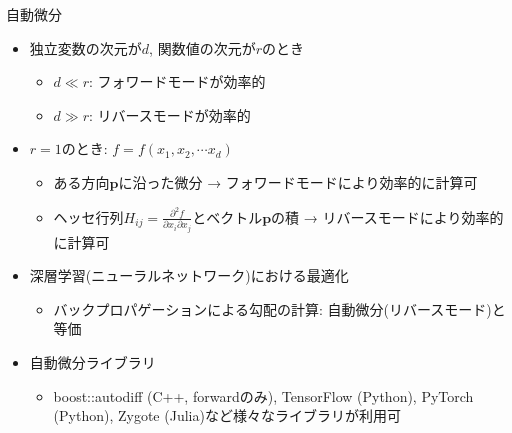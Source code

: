 \begin{frame}[t,fragile]{自動微分}
  \begin{itemize}
  \item 独立変数の次元が$d$, 関数値の次元が$r$のとき
    \begin{itemize}
    \item $d \ll r$: フォワードモードが効率的
    \item $d \gg r$: リバースモードが効率的
    \end{itemize}
  \item $r=1$のとき: $f=f(x_1,x_2, \cdots x_d)$
    \begin{itemize}
    \item ある方向$\mathbf{p}$に沿った微分 → フォワードモードにより効率的に計算可
    \item ヘッセ行列$\displaystyle H_{ij} = \frac{\partial^2 f}{\partial x_i \partial x_j}$とベクトル$\mathbf{p}$の積 → リバースモードにより効率的に計算可
    \end{itemize}
  \item 深層学習(ニューラルネットワーク)における最適化
    \begin{itemize}
    \item バックプロパゲーションによる勾配の計算: 自動微分(リバースモード)と等価
    \end{itemize}
  \item 自動微分ライブラリ
    \begin{itemize}
    \item boost::autodiff (C++, forwardのみ), TensorFlow (Python), PyTorch (Python), Zygote (Julia)など様々なライブラリが利用可
    \end{itemize}
  \end{itemize}
\end{frame}
